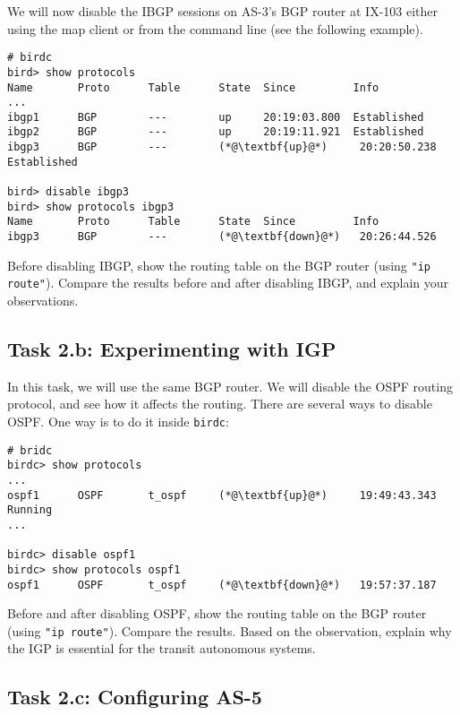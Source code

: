 We will now disable the IBGP sessions on AS-3's BGP router 
at IX-103 either using the map client or 
from the command line (see the following example).

\begin{lstlisting}
# birdc
bird> show protocols
Name       Proto      Table      State  Since         Info
...
ibgp1      BGP        ---        up     20:19:03.800  Established
ibgp2      BGP        ---        up     20:19:11.921  Established
ibgp3      BGP        ---        (*@\textbf{up}@*)     20:20:50.238  Established

bird> disable ibgp3 
bird> show protocols ibgp3
Name       Proto      Table      State  Since         Info
ibgp3      BGP        ---        (*@\textbf{down}@*)   20:26:44.526
\end{lstlisting}
 
Before disabling IBGP, show the routing table 
on the BGP router (using \texttt{"ip route"}). Compare the 
results before and after disabling IBGP, and explain
your observations. 


\subsection{Task 2.b: Experimenting with IGP} 

In this task, we will use the same BGP router. 
We will disable the OSPF routing protocol, and see 
how it affects the routing. There are several ways to disable
OSPF. One way is to do it inside \texttt{birdc}: 

\begin{lstlisting}
# bridc
birdc> show protocols
...
ospf1      OSPF       t_ospf     (*@\textbf{up}@*)     19:49:43.343  Running
...

birdc> disable ospf1
birdc> show protocols ospf1
ospf1      OSPF       t_ospf     (*@\textbf{down}@*)   19:57:37.187
\end{lstlisting}
 
Before and after disabling OSPF, show the routing table 
on the BGP router (using \texttt{"ip route"}). Compare the 
results. Based on the observation, explain why the IGP is essential 
for the transit autonomous systems. 



\subsection{Task 2.c: Configuring AS-5} 


